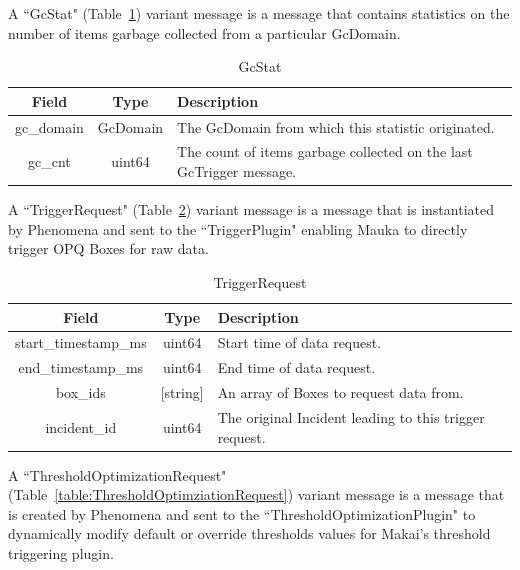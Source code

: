 A ``GcStat" (Table~\ref{table:GcStat}) variant message is a message that contains statistics on the number of items garbage collected from a particular GcDomain.

\begin{table}[H]
	\centering
	\caption{GcStat}
	\begin{tabular}{|c|c|p{8cm}|}
		\hline
		Field & Type & Description  \\
		\hline
		gc\_domain & GcDomain & The GcDomain from which this statistic originated. \\
		\hline
		gc\_cnt & uint64 & The count of items garbage collected on the last GcTrigger message.  \\
		\hline
	\end{tabular}
	\label{table:GcStat}
\end{table}

A ``TriggerRequest" (Table~\ref{table:TriggerRequest}) variant message is a message that is instantiated by Phenomena and sent to the ``TriggerPlugin" enabling Mauka to directly trigger OPQ Boxes for raw data.

\begin{table}[H]
	\centering
	\caption{TriggerRequest}
	\begin{tabular}{|c|c|p{8cm}|}
		\hline
		Field & Type & Description  \\
		\hline
		start\_timestamp\_ms & uint64 & Start time of data request. \\
		\hline
		end\_timestamp\_ms & uint64 & End time of data request. \\
		\hline
		box\_ids & [string] & An array of Boxes to request data from. \\
		\hline
		incident\_id & uint64 & The original Incident leading to this trigger request. \\
		\hline
	\end{tabular}
	\label{table:TriggerRequest}
\end{table}

A ``ThresholdOptimizationRequest" (Table~\ref{table:ThresholdOptimziationRequest}) variant message is a message that is created by Phenomena and sent to the ``ThresholdOptimizationPlugin" to dynamically modify default or override thresholds values for Makai's threshold triggering plugin.

